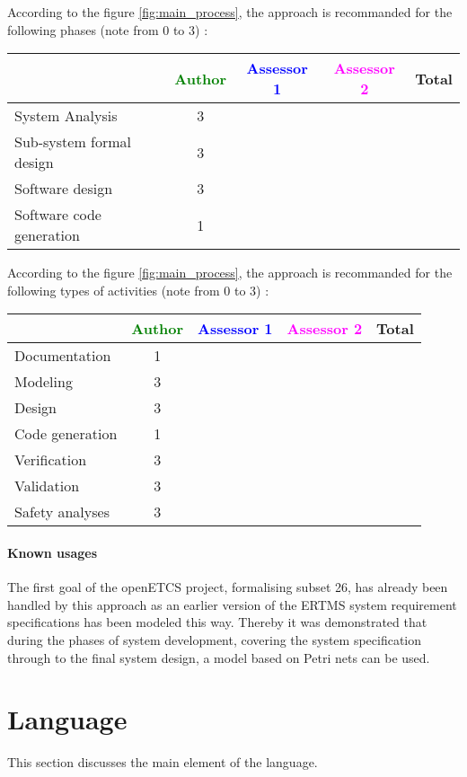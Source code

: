 According to the figure \ref{fig:main_process}, the approach is recommanded for the following phases (note from 0 to  3) :

\begin{tabular}{|l | c | c | c | c|}
\hline
& \textcolor{green}{Author} & \textcolor{blue}{Assessor 1} & \textcolor{magenta}{Assessor 2} & Total \\
\hline 
System Analysis & 3 & & &  \\
\hline
Sub-system formal design & 3 & & & \\
\hline
Software design & 3 & & & \\
\hline
Software code generation & 1 & & & \\
\hline
\end{tabular}

According to the figure \ref{fig:main_process}, the approach is recommanded for the following types of activities (note from 0 to  3) :

\begin{tabular}{|l | c | c | c | c|}
\hline
& \textcolor{green}{Author} & \textcolor{blue}{Assessor 1} & \textcolor{magenta}{Assessor 2} & Total \\
\hline 
Documentation & 1 & & &  \\
\hline
Modeling & 3 & & &  \\
\hline
Design & 3 & & & \\
\hline
Code generation & 1 & & & \\
\hline
Verification & 3 & & & \\
\hline
Validation & 3 & & & \\
\hline
Safety analyses & 3 & & & \\
\hline
\end{tabular}

\paragraph{Known usages} 

The first goal of the openETCS project, formalising subset 26, has already been handled by this approach as  an earlier version of the ERTMS system requirement specifications has been modeled this way. Thereby it  was  demonstrated  that  during  the  phases  of  system development, covering the system specification through to the final system design, a  model based on Petri nets can be used.

\section{Language}
This section discusses the main element of the language.

